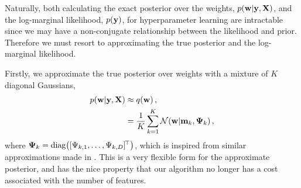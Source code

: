 \documentclass[11pt, oneside]{article}
\begin{document}
Naturally, both calculating the exact posterior over the weights,
$p\!\left({\mathbf{w}}\middle\vert{\ensuremath{\mathbf{y}}, \ensuremath{\mathbf{X}}}\right)$, and the log-marginal likelihood,
$p\!\left({\mathbf{y}}\right)$, for hyperparameter learning are intractable since we may have a
non-conjugate relationship between the likelihood and prior. Therefore we must
resort to approximating the true posterior and the log-marginal likelihood.

Firstly, we approximate the true posterior over weights with a mixture of $K$
diagonal Gaussians,
\begin{align}
    p\!\left({\mathbf{w}}\middle\vert{\ensuremath{\mathbf{y}}, \ensuremath{\mathbf{X}}}\right) &\approx q\!\left({\mathbf{w}}\right), \nonumber \\
    &= \frac{1}{K} \sum^K_{k=1} \mathcal{N}\!\left({\mathbf{w}}\middle\vert{\ensuremath{\mathbf{m}}_k, \ensuremath{\boldsymbol{\Psi}}_k}\right),
\end{align}
where $\boldsymbol{\Psi}_k = \text{diag}\!\left({[\Psi_{k,1}, \ldots, \Psi_{k, D}]^{\!\top}}\right)$, which
is inspired from similar approximations made in \citet{gershman2012,
    nguyen2014automated}. This is a very flexible form for the approximate
posterior, and has the nice property that our algorithm no longer has a
 cost associated with the number of features.
\end{document}
